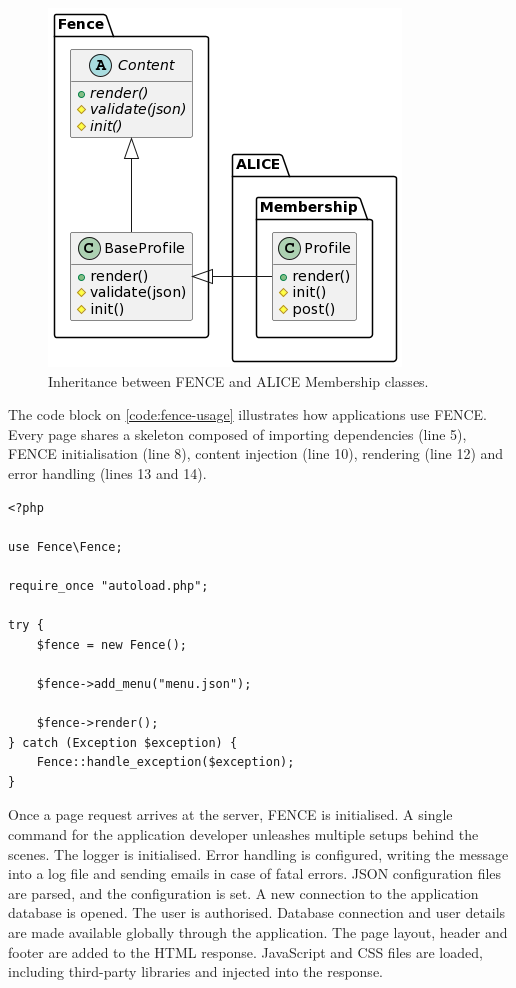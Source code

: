 \begin{figure}[htbp]
  \centering
  \includegraphics[scale=0.7]{Imagens/chap02/fence-class-diagram.png}
  \caption{Inheritance between FENCE and ALICE Membership classes.}
  \label{fig:fence-inheritance}
\end{figure}

The code block on \autoref{code:fence-usage} illustrates how applications use FENCE. Every page shares a skeleton composed of importing dependencies (line 5), FENCE initialisation (line 8), content injection (line 10), rendering (line 12) and error handling (lines 13 and 14).

\begin{listing}
\begin{verbatim}
<?php

use Fence\Fence;

require_once "autoload.php";

try {
    $fence = new Fence();

    $fence->add_menu("menu.json");

    $fence->render();
} catch (Exception $exception) {
    Fence::handle_exception($exception);
}
\end{verbatim}
\caption{FENCE usage example.}
\label{code:fence-usage}
\end{listing}

Once a page request arrives at the server, FENCE is initialised. A single command for the application developer unleashes multiple setups behind the scenes. The logger is initialised. Error handling is configured, writing the message into a log file and sending emails in case of fatal errors. JSON configuration files are parsed, and the configuration is set. A new connection to the application database is opened. The user is authorised. Database connection and user details are made available globally through the application. The page layout, header and footer are added to the HTML response. JavaScript and CSS files are loaded, including third-party libraries and injected into the response.

